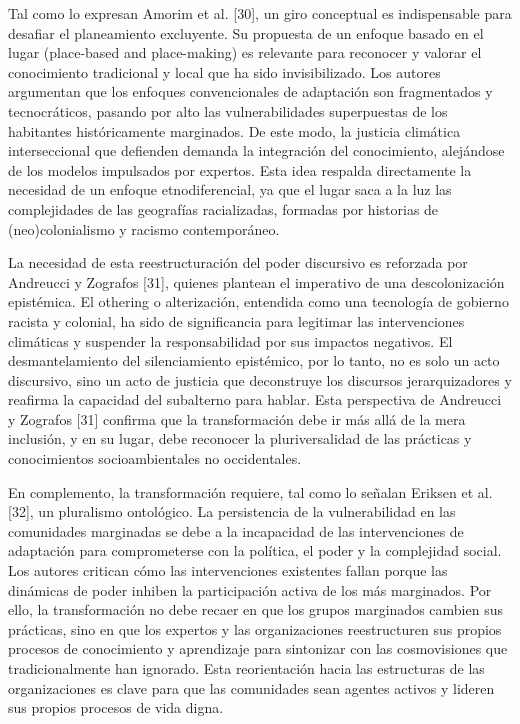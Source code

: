 \documentclass[
  spanish,
  letterpaper,
]{book}
\begin{document}
Tal como lo expresan Amorim et al. {[}30{]}, un giro conceptual es
indispensable para desafiar el planeamiento excluyente. Su propuesta de
un enfoque basado en el lugar (place-based and place-making) es
relevante para reconocer y valorar el conocimiento tradicional y local
que ha sido invisibilizado. Los autores argumentan que los enfoques
convencionales de adaptación son fragmentados y tecnocráticos, pasando
por alto las vulnerabilidades superpuestas de los habitantes
históricamente marginados. De este modo, la justicia climática
interseccional que defienden demanda la integración del conocimiento,
alejándose de los modelos impulsados por expertos. Esta idea respalda
directamente la necesidad de un enfoque etnodiferencial, ya que el lugar
saca a la luz las complejidades de las geografías racializadas, formadas
por historias de (neo)colonialismo y racismo contemporáneo.

La necesidad de esta reestructuración del poder discursivo es reforzada
por Andreucci y Zografos {[}31{]}, quienes plantean el imperativo de una
descolonización epistémica. El othering o alterización, entendida como
una tecnología de gobierno racista y colonial, ha sido de significancia
para legitimar las intervenciones climáticas y suspender la
responsabilidad por sus impactos negativos. El desmantelamiento del
silenciamiento epistémico, por lo tanto, no es solo un acto discursivo,
sino un acto de justicia que deconstruye los discursos jerarquizadores y
reafirma la capacidad del subalterno para hablar. Esta perspectiva de
Andreucci y Zografos {[}31{]} confirma que la transformación debe ir más
allá de la mera inclusión, y en su lugar, debe reconocer la
pluriversalidad de las prácticas y conocimientos socioambientales no
occidentales.

En complemento, la transformación requiere, tal como lo señalan Eriksen
et al. {[}32{]}, un pluralismo ontológico. La persistencia de la
vulnerabilidad en las comunidades marginadas se debe a la incapacidad de
las intervenciones de adaptación para comprometerse con la política, el
poder y la complejidad social. Los autores critican cómo las
intervenciones existentes fallan porque las dinámicas de poder inhiben
la participación activa de los más marginados. Por ello, la
transformación no debe recaer en que los grupos marginados cambien sus
prácticas, sino en que los expertos y las organizaciones reestructuren
sus propios procesos de conocimiento y aprendizaje para sintonizar con
las cosmovisiones que tradicionalmente han ignorado. Esta reorientación
hacia las estructuras de las organizaciones es clave para que las
comunidades sean agentes activos y lideren sus propios procesos de vida
digna.
\end{document}
